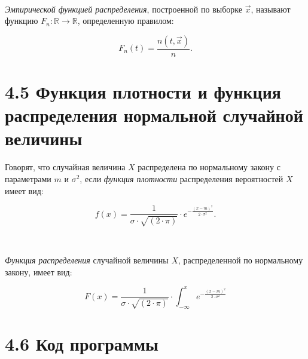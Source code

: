 \documentclass[12pt]{report}
\begin{document}
~\

\textit{Эмпирической функцией распределения}, построенной по выборке $\vec{x}$, называют функцию $F_n: \mathbb{R} \to \mathbb{R}$, определенную правилом: 

\begin{equation*}
	F_n(t) = \frac{n(t, \vec x)}{n}.
\end{equation*}

\section*{4.5 Функция плотности и функция распределения нормальной случайной величины}

Говорят, что случайная величина $X$ распределена по нормальному закону с параметрами $m$ и $\sigma^2$, если \textit{функция плотности} распределения вероятностей $X$ имеет вид:

\begin{equation*}
	f(x) = \frac{1}{\sigma \cdot \sqrt{(2 \cdot \pi)}} \cdot e^{-\frac{(x - m)^2}{2\cdot\sigma^2}}.
\end{equation*}

~\

\textit{Функция распределения} случайной величины $X$, распределенной по нормальному закону, имеет вид:

\begin{equation*}
	F(x) = \frac{1}{\sigma \cdot \sqrt{(2 \cdot \pi)}} \cdot \int_{-\infty}^{x}e^{-\frac{(x - m)^2}{2\cdot\sigma^2}}
\end{equation*}

\clearpage

\section*{4.6 Код программы}
\end{document}
